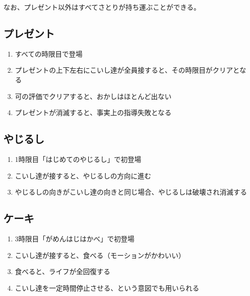 なお、プレゼント以外はすべてさとりが持ち運ぶことができる。


\subsection{プレゼント}
\begin{enumerate}[label={\sarrow}]
\item すべての時限目で登場
\item プレゼントの上下左右にこいし達が全員接すると、その時限目がクリアとなる
\item 可の評価でクリアすると、おかしはほとんど出ない
\item プレゼントが消滅すると、事実上の指導失敗となる
\end{enumerate}


\subsection{やじるし}
\begin{enumerate}[label={\sarrow}]
\item 1時限目「はじめてのやじるし」で初登場
\item こいし達が接すると、やじるしの方向に進む
\item やじるしの向きがこいし達の向きと同じ場合、やじるしは破壊され消滅する
\end{enumerate}


\subsection{ケーキ}
\begin{enumerate}[label={\sarrow}]
\item 3時限目「がめんはじはかべ」で初登場
\item こいし達が接すると、食べる（モーションがかわいい）
\item 食べると、ライフが全回復する
\item こいし達を一定時間停止させる、という意図でも用いられる
\end{enumerate}


